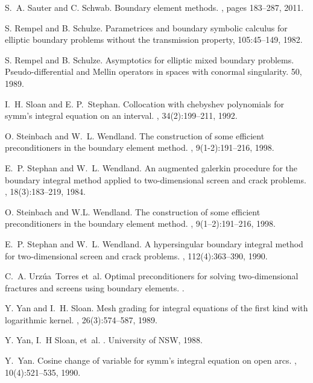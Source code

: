 \documentclass[a4paper]{article}
\begin{document}
\begin{thebibliography}{10}
S.~A. Sauter and C. Schwab.
\newblock Boundary element methods.
, pages 183--287, 2011.

 S. Rempel and B. Schulze. \newblock Parametrices and boundary symbolic calculus for elliptic boundary problems without the transmission property,  105:45--149, 1982.

 S. Rempel and B. Schulze. Asymptotics for elliptic mixed boundary problems. Pseudo-differential and Mellin operators in spaces with conormal singularity.  50, 1989.

I.~H. Sloan and E. P.~Stephan.
\newblock Collocation with chebyshev polynomials for symm's integral equation
  on an interval.
, 34(2):199--211, 1992.

O. Steinbach and W.~L. Wendland.
\newblock The construction of some efficient preconditioners in the boundary
  element method.
, 9(1-2):191--216, 1998.

E.~P. Stephan and W.~L. Wendland.
\newblock An augmented galerkin procedure for the boundary integral method
  applied to two-dimensional screen and crack problems.
, 18(3):183--219, 1984.

{O.} Steinbach and {W.L.} Wendland.
\newblock The construction of some efficient preconditioners in the boundary
  element method.
, 9(1--2):191--216, 1998.

E.~P. Stephan and W.~L. Wendland.
\newblock A hypersingular boundary integral method for two-dimensional screen
  and crack problems.
, 112(4):363--390,
  1990.

C.~A. Urz{\'u}a~Torres et~al.
\newblock Optimal preconditioners for solving two-dimensional fractures and
  screens using boundary elements.
.

Y. Yan and I.~H. Sloan.
\newblock Mesh grading for integral equations of the first kind with
  logarithmic kernel.
, 26(3):574--587, 1989.

Y. Yan, I.~H Sloan, et~al.
.
\newblock University of NSW, 1988.

Y.~Yan.
\newblock Cosine change of variable for symm's integral equation on open arcs.
, 10(4):521--535, 1990.

\end{thebibliography}

	
	
\end{document}
